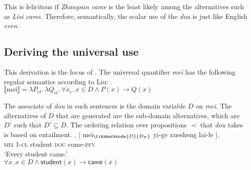 \documentclass[12pt]{article}
\begin{document}
This is felicitous if \emph{Zhangsan came} is the least likely among the alternatives such as \emph{Lisi came}.
Therefore, semantically, the scalar use of the \emph{dou} is just like English \emph{even}.






\subsection{Deriving the universal use}
\label{sub:deriving_the_universal_use}


This derivation is the focus of \citet{liuPragmaticExplanationMeidou2021}.
The universal quantifier \emph{mei} has the following regular semantics according to Liu:
\ex. \(\llbracket \text{mei} \rrbracket = \lambda P_{et}.\, \lambda Q_{et}.\, \forall x_{e}.\, x \in D \land P(x) \to Q(x)\)

The associate of \emph{dou} in such sentences is the domain variable \(D\) on \emph{mei}.
The alternatives of \(D\) that are generated are the sub-domain alternatives, which are \(D'\) such that \(D' \subseteq D\).
The ordering relation over propositions \(\prec\) that \emph{dou} takes is based on entailment.
\vspace{2.5em}
\ex.  \gll
{} [ mei\(_{\tikzmarknode{D}{D_F}}\) yi-ge xuesheng  lai-le ].\\
{} {} \textsc{mei} 1-\textsc{cl} student \textsc{dou} come-\textsc{pfv}\\
\glt `Every student came.'\\
\(\forall x.\, x \in D \land \mathsf{student}(x) \to \mathsf{came}(x) \)
\end{document}
